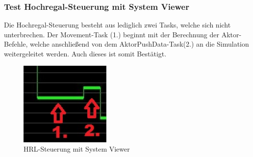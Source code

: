 \subsubsection{Test Hochregal-Steuerung mit System Viewer}
Die Hochregal-Steuerung besteht aus lediglich zwei Tasks, welche sich nicht unterbrechen. Der Movement-Task (1.) beginnt mit der Berechnung der Aktor-Befehle, welche anschließend von dem AktorPushData-Task(2.) an die Simulation weitergeleitet werden. Auch dieses ist somit Bestätigt.
\begin{figure}[H]
	\centering
  \includegraphics[width=0.4\textwidth]{diagrams/steuerung_zeit.jpg}
	\caption{HRL-Steuerung mit System Viewer}
	\label{fig5}
\end{figure}